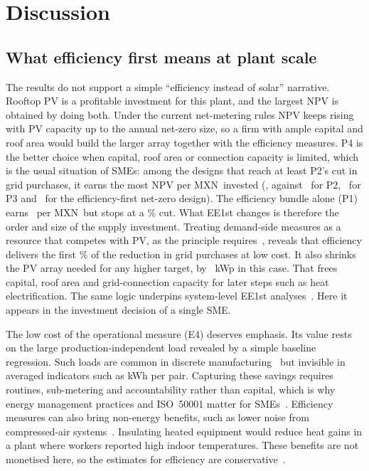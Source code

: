 \documentclass[processes,article,submit,pdftex,moreauthors]{Definitions/mdpi}
\newcommand{\MXN}{MXN}
\begin{document}
\section{Discussion}
\label{sec:discussion}

\subsection{What efficiency first means at plant scale}
The results do not support a simple ``efficiency instead of solar'' narrative. Rooftop PV is a profitable investment for this plant, and the largest NPV is obtained by doing both. Under the current net-metering rules NPV keeps rising with PV capacity up to the annual net-zero size, so a firm with ample capital and roof area would build the larger array together with the efficiency measures. P4 is the better choice when capital, roof area or connection capacity is limited, which is the usual situation of SMEs: among the designs that reach at least P2's cut in grid purchases, it earns the most NPV per \MXN\ invested (\nNPVCapexFour, against \nNPVCapexTwo\ for P2, \nNPVCapexThree\ for P3 and \nNPVCapexNZE\ for the efficiency-first net-zero design). The efficiency bundle alone (P1) earns \nNPVCapexOne\ per \MXN\ but stops at a \nEESavedPct\% cut. What EE1st changes is therefore the order and size of the supply investment. Treating demand-side measures as a resource that competes with PV, as the principle requires~\cite{mandel2022,ec2021ee1st}, reveals that efficiency delivers the first \nEESavedPct\% of the reduction in grid purchases at low cost. It also shrinks the PV array needed for any higher target, by \nPVDiffFour~kWp in this case. That frees capital, roof area and grid-connection capacity for later steps such as heat electrification. The same logic underpins system-level EE1st analyses~\cite{mandel2023,pato2022}. Here it appears in the investment decision of a single SME.

The low cost of the operational measure (E4) deserves emphasis. Its value rests on the large production-independent load revealed by a simple baseline regression. Such loads are common in discrete manufacturing~\cite{kara2011,mouzon2007} but invisible in averaged indicators such as kWh per pair. Capturing these savings requires routines, sub-metering and accountability rather than capital, which is why energy management practices and ISO~50001 matter for SMEs~\cite{thollander2025,mckane2017}. Efficiency measures can also bring non-energy benefits, such as lower noise from compressed-air systems~\cite{nehler2018}. Insulating heated equipment would reduce heat gains in a plant where workers reported high indoor temperatures. These benefits are not monetised here, so the estimates for efficiency are conservative~\cite{worrell2003,nehler2016}.
\end{document}
